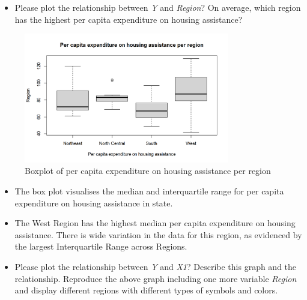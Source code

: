\documentclass[12pt,letterpaper]{article}
\begin{document}
\newpage
\begin{itemize}
\item
Please plot the relationship between \emph{Y} and \emph{Region}? On average, which region has the highest per capita expenditure on housing assistance?
\end{itemize}
\vspace{.5cm}


\begin{figure}[H]
	\caption{Boxplot of per capita expenditure on housing assistance per region}
	\centering
	\includegraphics[width=0.8\textwidth]{Figure_2_1.png}
\end{figure}
\vspace{.5cm}

\begin{itemize}
\item 
The box plot visualises the median and interquartile range for per capita expenditure on housing assistance in state. 
\item 
The West Region has the highest median per capita expenditure on housing assistance. There is wide variation in the data for this region, as evidenced by the largest Interquartile Range across Regions. 
\end{itemize}

\newpage
\begin{itemize}
\item
Please plot the relationship between \emph{Y} and \emph{X1}? Describe this graph and the relationship. Reproduce the above graph including one more variable \emph{Region} and display different regions with different types of symbols and colors.
\end{itemize}
\end{document}
